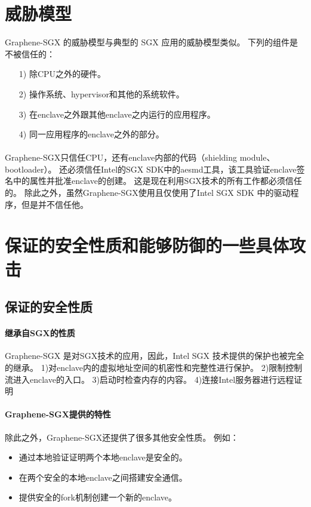 \section{威胁模型}
Graphene-SGX 的威胁模型与典型的 SGX 应用的威胁模型类似。
下列的组件是不被信任的：
\begin{itemize}
    \item [1)] 
    除CPU之外的硬件。
    \item [2)]
    操作系统、hypervisor和其他的系统软件。
    \item [3)]
    在enclave之外跟其他enclave之内运行的应用程序。
    \item [4)]
    同一应用程序的enclave之外的部分。
\end{itemize}   
\paragraph{}
Graphene-SGX只信任CPU，还有enclave内部的代码（shielding module、bootloader）。
还必须信任Intel的SGX SDK中的aesmd工具，该工具验证enclave签名中的属性并批准enclave的创建。
这是现在利用SGX技术的所有工作都必须信任的。
除此之外，虽然Graphene-SGX使用且仅使用了Intel SGX SDK 中的驱动程序，但是并不信任他。

\section{保证的安全性质和能够防御的一些具体攻击}
\subsection{保证的安全性质}
\paragraph{继承自SGX的性质}
Graphene-SGX 是对SGX技术的应用，因此，Intel SGX 技术提供的保护也被完全的继承。
1)对enclave内的虚拟地址空间的机密性和完整性进行保护。
2)限制控制流进入enclave的入口。
3)启动时检查内存的内容。
4)连接Intel服务器进行远程证明

\paragraph{Graphene-SGX提供的特性}
除此之外，Graphene-SGX还提供了很多其他安全性质。
例如：
\begin{itemize}
    \item 通过本地验证证明两个本地enclave是安全的。
    \item 在两个安全的本地enclave之间搭建安全通信。
    \item 提供安全的fork机制创建一个新的enclave。
\end{itemize}

